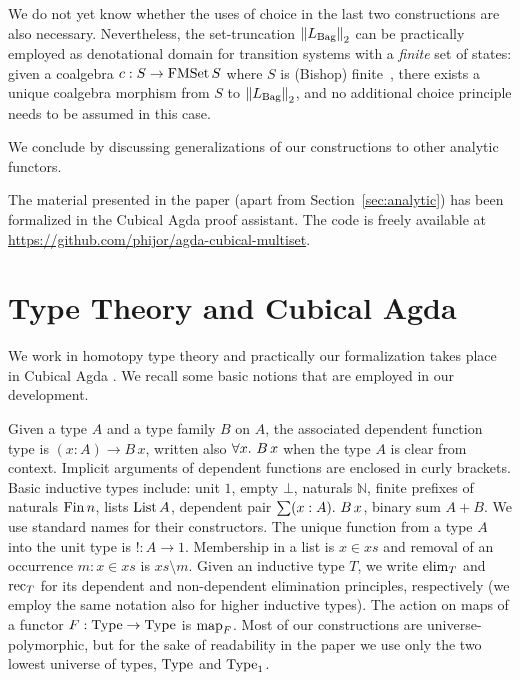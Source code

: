 \documentclass[a4paper,USenglish,cleveref]{lipics-v2021}
\begin{document}
We do not yet know whether the uses of choice in the last two constructions are also necessary. Nevertheless, the set-truncation $\SetTrunc{\Lim{\Bag}}$ can be practically employed as denotational domain for transition systems with a \emph{finite} set of states: given a coalgebra $c : S \to \FMSet S$ where $S$ is (Bishop) finite~\cite{Frumin2018}, there exists a unique coalgebra morphism from $S$ to $\SetTrunc{\Lim{\Bag}}$, and no additional choice principle needs to be assumed in this case. 

We conclude by discussing generalizations of our constructions to other analytic functors.

The material presented in the paper (apart from Section~\ref{sec:analytic}) has been formalized in the Cubical Agda proof
assistant. The code is freely available at \url{https://github.com/phijor/agda-cubical-multiset}.

\section{Type Theory and Cubical Agda}

We work in homotopy type theory \cite{HoTTBook} and practically our formalization takes place in Cubical Agda \cite{Vezzosi2019}. We recall some basic notions that are employed in our development.

Given a type $A$ and a type family $B$ on $A$, the associated dependent function type is $(x : A) \to B \, x$, written also $\forall x \mathpunct{.}\, B\,x$ when the type $A$ is clear from context. Implicit arguments of dependent functions are enclosed in curly brackets. Basic inductive types include: unit $1$, empty $\bot$, naturals $ℕ$, finite prefixes of naturals $\Fin n$, lists $\List A$, dependent pair $\sum (x : A) \mathpunct{.}\, B \, x$, binary sum $A + B$. We use standard names for their constructors. The unique function from a type $A$ into the unit type is $! : A \to 1$. Membership in a list is $x \in xs$ and removal of an occurrence $m : x \in xs$ is $xs \setminus m$. Given an inductive type $T$, we write $\Elim{T}$ and $\Rec{T}$ for its dependent and non-dependent elimination  principles, respectively (we employ the same notation also for higher inductive types). The action on maps of a functor $F : \Type \to \Type$ is $\Map{F}$. Most of our constructions are universe-polymorphic, but for the sake of readability in the paper we use only the two lowest universe of types, $\Type$ and $\Type_1$.
\end{document}
